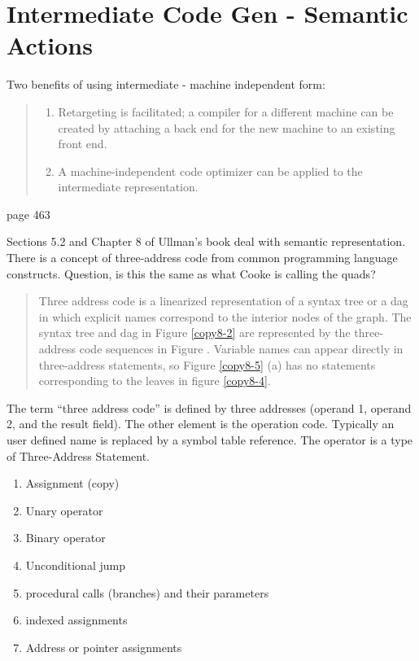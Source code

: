 \chapter {Intermediate Code Gen - Semantic Actions }

Two benefits of using intermediate - machine independent form:
\begin{quote}
\begin{enumerate}
\item Retargeting is facilitated; a compiler for a different machine can be created by attaching a back end for the new machine to an existing front end. 
\item A machine-independent  code optimizer can be applied to the intermediate representation.  
\end{enumerate}
 \end {quote} \cite{ullmanCompiler} page 463
 
 Sections 5.2 and Chapter 8 of Ullman's book deal with semantic representation.  There is a concept of three-address code from common programming language constructs.  Question, is this the same as what Cooke is calling the quads?  
 
 
 \begin{quote}
 Three address code is a linearized representation of a syntax tree or a dag in which explicit names correspond to the interior nodes of the graph.  The syntax tree and dag in Figure \ref{copy8-2} are represented by the three-address code sequences  in Figure \cite{copy8-5}.  Variable names can appear directly in three-address statements, so Figure \ref{copy8-5} (a)  has no statements corresponding to the leaves in figure \ref{copy8-4}.  
 \end{quote}
 
 The term ``three address code'' is defined by three addresses (operand 1, operand 2, and the result field).  The other element is the operation code.  Typically an user defined name is replaced by a symbol table reference.   The operator is a type of Three-Address Statement.
 
 \begin{enumerate}
\item Assignment (copy)
\item Unary operator
\item Binary operator
\item Unconditional jump
\item procedural calls (branches) and their parameters
\item indexed assignments
\item Address or pointer assignments
\end{enumerate}

